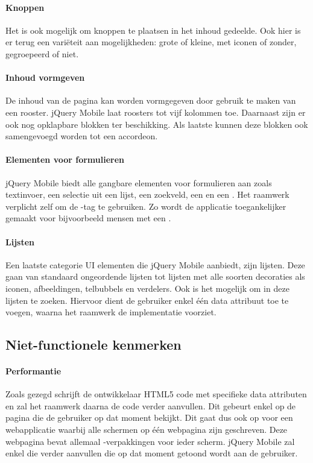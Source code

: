 \paragraph{Knoppen}
Het is ook mogelijk om knoppen te plaatsen in het inhoud gedeelde. Ook hier is er terug een variëteit aan mogelijkheden: grote of kleine, met iconen of zonder, gegroepeerd of niet. 

\paragraph{Inhoud vormgeven}
De inhoud van de pagina kan worden vormgegeven door gebruik te maken van een rooster. jQuery Mobile laat roosters tot vijf kolommen toe. Daarnaast zijn er ook nog opklapbare blokken ter beschikking. Als laatste kunnen deze blokken ook samengevoegd worden tot een accordeon. 

\paragraph{Elementen voor formulieren}
jQuery Mobile biedt alle gangbare elementen voor formulieren aan zoals textinvoer, een selectie uit een lijst, een zoekveld, een  en een . Het raamwerk verplicht zelf om de -tag te gebruiken. Zo wordt de applicatie toegankelijker gemaakt voor bijvoorbeeld mensen met een .

\paragraph{Lijsten}
Een laatste categorie UI elementen die jQuery Mobile aanbiedt, zijn lijsten. Deze gaan van standaard ongeordende lijsten tot lijsten met alle soorten decoraties als iconen, afbeeldingen, telbubbels en verdelers. Ook is het mogelijk om in deze lijsten te zoeken. Hiervoor dient de gebruiker enkel één data attribuut toe te voegen, waarna het raamwerk de implementatie voorziet. 

\subsection{Niet-functionele kenmerken}
\paragraph{Performantie}
Zoals gezegd schrijft de ontwikkelaar HTML5 code met specifieke data attributen en zal het raamwerk daarna de code verder aanvullen. Dit gebeurt enkel op de pagina die de gebruiker op dat moment bekijkt. Dit gaat dus ook op voor een webapplicatie waarbij alle schermen op één webpagina zijn geschreven. Deze webpagina bevat allemaal -verpakkingen voor ieder scherm. jQuery Mobile zal enkel die  verder aanvullen die op dat moment getoond wordt aan de gebruiker. 

